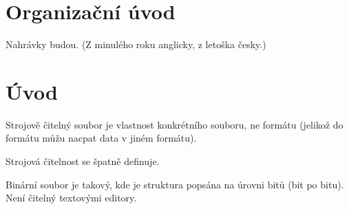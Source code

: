 \documentclass[12pt]{article}					%
\begin{document}

\section*{Organizační úvod}
\begin{poznamka}
	Nahrávky budou. (Z minulého roku anglicky, z letoška česky.)
\end{poznamka}

\section{Úvod}
\begin{definice}
	Strojově čitelný soubor je vlastnost konkrétního souboru, ne formátu (jelikož do formátu můžu nacpat data v jiném formátu).

	Strojová čitelnost se špatně definuje.
\end{definice}

\begin{definice}
	Binární soubor je takový, kde je struktura popsána na úrovni bitů (bit po bitu). Není čitelný textovými editory.
\end{definice}
\end{document}
